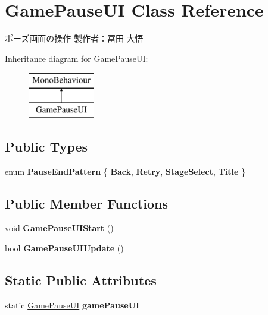 \hypertarget{class_game_pause_u_i}{}\section{Game\+Pause\+UI Class Reference}
\label{class_game_pause_u_i}


ポーズ画面の操作 製作者：冨田 大悟  


Inheritance diagram for Game\+Pause\+UI\+:\begin{figure}[H]
\begin{center}
\leavevmode
\includegraphics[height=2.000000cm]{class_game_pause_u_i}
\end{center}
\end{figure}
\subsection*{Public Types}
\begin{DoxyCompactItemize}
\item 
\mbox{\label{class_game_pause_u_i_ab739451a68b97861695bec43ac08bf65}} 
enum {\bfseries Pause\+End\+Pattern} \{ {\bfseries Back}, 
{\bfseries Retry}, 
{\bfseries Stage\+Select}, 
{\bfseries Title}
 \}
\end{DoxyCompactItemize}
\subsection*{Public Member Functions}
\begin{DoxyCompactItemize}
\item 
\mbox{\label{class_game_pause_u_i_a4dba69022d3a02134220e0775ac52c19}} 
void {\bfseries Game\+Pause\+U\+I\+Start} ()
\item 
\mbox{\label{class_game_pause_u_i_a76974eb0d0ba3d354de3b27da1d6d46b}} 
bool {\bfseries Game\+Pause\+U\+I\+Update} ()
\end{DoxyCompactItemize}
\subsection*{Static Public Attributes}
\begin{DoxyCompactItemize}
\item 
\mbox{\label{class_game_pause_u_i_ad75eec6157889b1324d91fa91a3572ba}} 
static \hyperlink{class_game_pause_u_i}{Game\+Pause\+UI} {\bfseries game\+Pause\+UI}
\end{DoxyCompactItemize}
